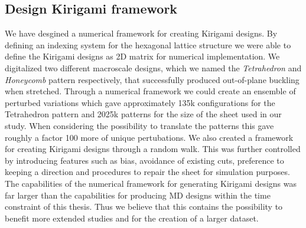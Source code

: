 \subsection{Design Kirigami framework}
We have desgined a numerical framework for creating Kirigami designs. By
defining an indexing system for the hexagonal lattice structure we were able to
define the Kirigami designs as 2D matrix for numerical implementation. We
digitalized two different macroscale designs, which we named the
\textit{Tetrahedron} and \textit{Honeycomb} pattern respectively, that
successfully produced out-of-plane buckling when stretched. Through a numerical
framework we could create an ensemble of perturbed variations which gave
approximately 135k configurations for the Tetrahedron pattern and 2025k patterns
for the size of the sheet used in our study. When considering the possibility to
translate the patterns this gave roughly a factor 100 more of unique
pertubations. We also created a framework for creating Kirigami designs through
a random walk. This was further controlled by introducing features such as bias,
avoidance of existing cuts, preference to keeping a direction and procedures to
repair the sheet for simulation purposes. The capabilities of the numerical framework for generating Kirigami designs was far larger than the capabilities for producing \acrshort{MD} designs within the time constraint of this thesis. Thus we believe that this contains the possibility to benefit more extended studies and for the creation of a larger dataset. 



